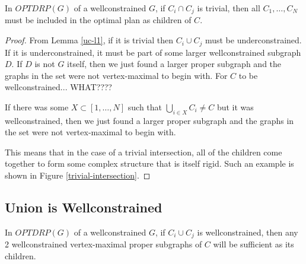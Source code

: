 \documentclass[11pt]{article}
\begin{document}
\begin{theorem}\label{uc-t1}

In $OPTDRP(G)$ of a wellconstrained $G$, if $C_i \cap C_j$ is trivial, then all $C_1,\ldots, C_N$ must be included in the optimal plan as children of $C$.
\end{theorem}

\begin{proof}
From Lemma \ref{uc-l1}, if it is trivial then $C_i \cup C_j$ must be underconstrained. If it is underconstrained, it must be part of some larger wellconstrained subgraph $D$. If $D$ is not $G$ itself, then we just found a larger proper subgraph and the graphs in the set were not vertex-maximal to begin with.
 For $C$ to be wellconstrained... WHAT????

If there was some $X\subset [1,\ldots,N]$ such that $\bigcup_{i\in X}{C_i}\neq C$ but it was wellconstrained, then we just found a larger proper subgraph and the graphs in the set were not vertex-maximal to begin with.

This means that in the case of a trivial intersection, all of the children come together to form some complex structure that is itself rigid. Such an example is shown in Figure \ref{trivial-intersection}.
\end{proof}








\subsection{Union is Wellconstrained}





\begin{theorem}\label{wc-t1}

In $OPTDRP(G)$ of a wellconstrained $G$, if $C_i \cup C_j$ is wellconstrained, then any 2 wellconstrained vertex-maximal proper subgraphs of $C$ will be sufficient as its children.
\end{theorem}
\end{document}
